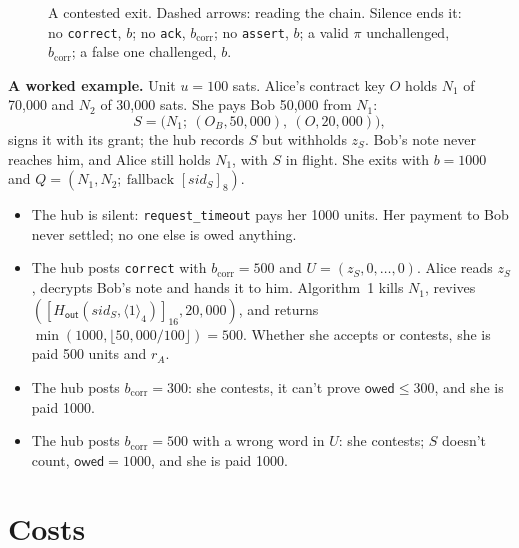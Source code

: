 \documentclass[11pt]{article}
\theoremstyle{plain}
\theoremstyle{definition}
\newcommand{\bcorr}{b_{\mathrm{corr}}}
\newcommand{\tx}[1]{\texttt{#1}}
\newcommand{\be}[2]{\langle #1\rangle_{#2}}
\newcommand{\pre}[2]{[#1]_{#2}}
\newcommand{\Ht}[1]{H_{\textsf{#1}}}
\newcommand{\sid}{\mathit{sid}}
\newcommand{\owed}{\mathsf{owed}}
\begin{document}
\begin{figure}[!tbp]
\caption{A contested exit. Dashed arrows: reading the chain. Silence
ends it: no \tx{correct}, $b$; no \tx{ack}, $\bcorr$; no \tx{assert},
$b$; a valid $\pi$ unchallenged, $\bcorr$; a false one challenged, $b$.}
\label{fig:exit}
\end{figure}

\textbf{A worked example.} Unit $u = 100$ sats. Alice's contract key $O$
holds $N_1$ of 70,000 and $N_2$ of 30,000 sats. She pays Bob 50,000 from
$N_1$:
\[
  S = \big(N_1;\ (O_B, 50{,}000),\ (O, 20{,}000)\big),
\]
signs it with its grant; the hub records $S$ but withholds $z_S$. Bob's
note never reaches him, and Alice still holds $N_1$, with $S$ in flight.
She exits with $b = 1000$ and $Q = (N_1, N_2;\ \text{fallback }
\pre{\sid_S}{8})$.
\begin{itemize}[nosep]
\item The hub is silent: \tx{request\_timeout} pays her 1000 units. Her
  payment to Bob never settled; no one else is owed anything.
\item The hub posts \tx{correct} with $\bcorr = 500$ and $U = (z_S, 0,
  \dots, 0)$. Alice reads $z_S$, decrypts Bob's note and hands it to
  him.
  Algorithm~1 kills $N_1$, revives $(\pre{\Ht{out}(\sid_S,
  \be{1}{4})}{16}, 20{,}000)$, and returns $\min(1000, \lfloor
  50{,}000/100\rfloor) = 500$. Whether she accepts or contests, she is
  paid 500 units and $r_A$.
\item The hub posts $\bcorr = 300$: she contests, it can't prove $\owed
  \le 300$, and she is paid 1000.
\item The hub posts $\bcorr = 500$ with a wrong word in $U$: she
  contests; $S$ doesn't count, $\owed = 1000$, and she is paid 1000.
\end{itemize}

\section{Costs}\label{sec:costs}
\end{document}
